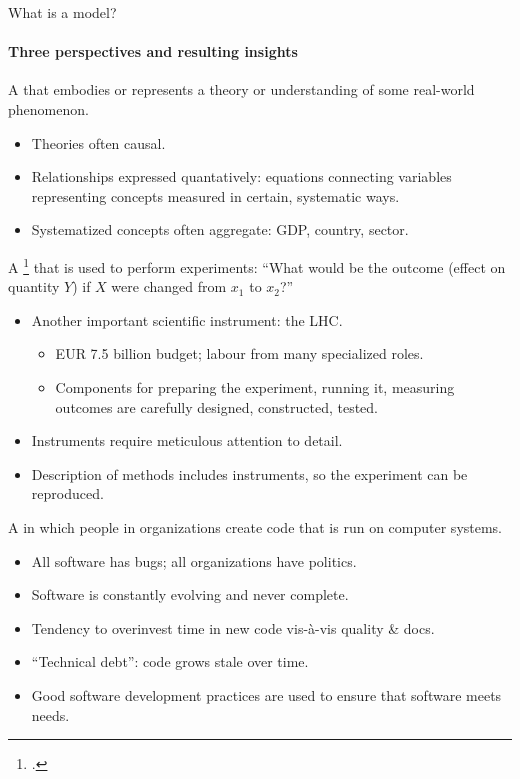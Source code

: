 \begin{frame}[allowframebreaks]{What is a model?}
\framesubtitle{Three perspectives and resulting insights}

A  that embodies or represents a theory or understanding of some real-world phenomenon.

\begin{itemize}
  \item Theories often causal.
  \item Relationships expressed quantatively: equations connecting variables representing concepts measured in certain, systematic ways.
  \item Systematized concepts often aggregate: GDP, country, sector.
\end{itemize}

\framebreak
A \footcite{omalley-2019} that is used to perform experiments: “What would be the outcome (effect on quantity $Y$) if $X$ were changed from $x_1$ to $x_2$?”

\begin{itemize}
  \item Another important scientific instrument: the LHC.
    \begin{itemize}
      \item EUR 7.5 billion budget; labour from many specialized roles.
      \item Components for preparing the experiment, running it, measuring outcomes are carefully designed, constructed, tested.
    \end{itemize}
  \item Instruments require meticulous attention to detail.
  \item Description of methods includes instruments, so the experiment can be reproduced.
\end{itemize}

\framebreak
A  in which people in organizations create code that is run on computer systems.

\begin{itemize}
  \item All software has bugs; all organizations have politics.
  \item Software is constantly evolving and never complete.
  \item Tendency to overinvest time in new code vis-à-vis quality \& docs.
  \item “Technical debt”: code grows stale over time.
  \item Good software development practices are used to ensure that software meets needs.
\end{itemize}

\end{frame}
